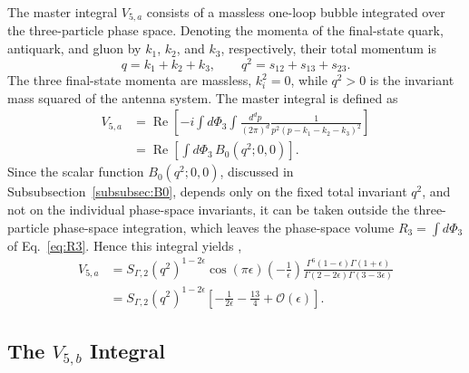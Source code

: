 The master integral $V_{5,a}$ consists of a massless one-loop bubble integrated over the
three-particle phase space. Denoting the momenta of the final-state quark, antiquark, and
gluon by $k_1$, $k_2$, and $k_3$, respectively, their total momentum is
\begin{equation*}
    q=k_1+k_2+k_3,\qquad q^2=s_{12}+s_{13}+s_{23}.
\end{equation*}
The three final-state momenta are massless, $k_i^2=0$, while $q^2>0$ is the invariant mass
squared of the antenna system. The master integral is defined as
\begin{equation}
    \begin{split}
        V_{5,a} &= \operatorname{Re}\!\left[-i\int d\Phi_3\int\frac{d^dp}{(2\pi)^d}\frac1{p^2(p-k_1-k_2-k_3)^2}\right]\\
                &= \operatorname{Re}\!\left[\int d\Phi_3\,B_0\!\left(q^2;0,0\right)\right].
    \end{split}
\end{equation}
Since the scalar function $B_0\!\left(q^2;0,0\right)$, discussed in
Subsubsection~\ref{subsubsec:B0}, depends only on the fixed total invariant $q^2$, and not
on the individual phase-space invariants, it can be taken outside the three-particle
phase-space integration, which leaves the phase-space volume $R_3=\int d\Phi_3$ of
Eq.~\eqref{eq:R3}. Hence this integral yields \cite{Gehrmann-DeRidder:2005btv},
\begin{equation}
    \begin{split}
        V_{5,a} &= S_{\Gamma,2}\!\left(q^2\right)^{1-2\epsilon}\cos(\pi\epsilon)\!\left(-\frac1\epsilon\right)\frac{\Gamma^6(1-\epsilon)\Gamma(1+\epsilon)}{\Gamma(2-2\epsilon)\Gamma(3-3\epsilon)}\\
                &= S_{\Gamma,2}\!\left(q^2\right)^{1-2\epsilon}\!\left[-\frac1{2\epsilon}-\frac{13}4+\mathcal O(\epsilon)\right].
    \end{split}
\end{equation}

\subsection{The $V_{5,b}$ Integral}

